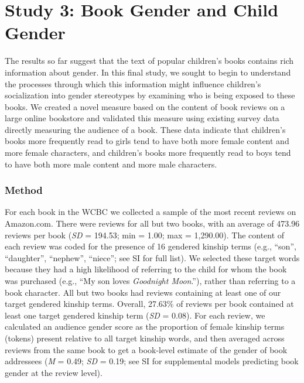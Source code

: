 \documentclass[
  english,
  ,man,floatsintext]{apa6}
\begin{document}
\hypertarget{study-3-book-gender-and-child-gender}{%
\section{Study 3: Book Gender and Child Gender}\label{study-3-book-gender-and-child-gender}}

The results so far suggest that the text of popular children's books contains rich information about gender. In this final study, we sought to begin to understand the processes through which this information might influence children's socialization into gender stereotypes by examining who is being exposed to these books. We created a novel measure based on the content of book reviews on a large online bookstore and validated this measure using existing survey data directly measuring the audience of a book. These data indicate that children's books more frequently read to girls tend to have both more female content and more female characters, and children's books more frequently read to boys tend to have both more male content and more male characters.

\hypertarget{method-2}{%
\subsubsection{Method}\label{method-2}}

For each book in the WCBC we collected a sample of the most recent reviews on Amazon.com. There were reviews for all but two books, with an average of 473.96 reviews per book (\emph{SD} = 194.53; min = 1.00; max = 1,290.00). The content of each review was coded for the presence of 16 gendered kinship terms (e.g., \enquote{son}, \enquote{daughter}, \enquote{nephew}, \enquote{niece}; see SI for full list). We selected these target words because they had a high likelihood of referring to the child for whom the book was purchased (e.g., \enquote{My son loves \emph{Goodnight Moon}.}), rather than referring to a book character. All but two books had reviews containing at least one of our target gendered kinship terms. Overall, 27.63\% of reviews per book contained at least one target gendered kinship term (\emph{SD} = 0.08). For each review, we calculated an audience gender score as the proportion of female kinship terms (tokens) present relative to all target kinship words, and then averaged across reviews from the same book to get a book-level estimate of the gender of book addressees (\emph{M} = 0.49; \emph{SD} = 0.19; see SI for supplemental models predicting book gender at the review level).
\end{document}
